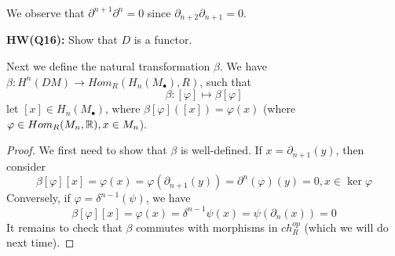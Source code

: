 We observe that $\partial^{n+1}\partial^n=0$ since $\partial_{n+2}\partial_{n+1}=0$.
\begin{prob}
    \textbf{HW(Q16):} Show that $D$ is a functor.
\end{prob}
Next we define the natural transformation $\beta$. We have $\beta: H^n(DM)\to Hom_R(H_n(M_\bullet),R)$, such that 
\begin{equation*}
    \beta: [\varphi]\mapsto \beta[\varphi]
\end{equation*}
let $[x]\in H_n(M_\bullet)$, where $\beta[\varphi]([x])=\varphi(x)$ (where $\varphi\in Hom_R(M_n,\mathbb{R}), x\in M_n$).
\begin{proof}
    We first need to show that $\beta$ is well-defined. If $x=\partial_{n+1}(y)$, then consider 
    \begin{equation*}
        \beta[\varphi][x]=\varphi(x)=\varphi(\partial_{n+1}(y))=\partial^n(\varphi)(y)=0, x\in\ker\varphi
    \end{equation*}
    Conversely, if $\varphi=\delta^{n-1}(\psi)$, we have 
    \begin{equation*}
        \beta[\varphi][x]=\varphi(x)=\delta^{n-1}\psi(x)=\psi(\partial_n(x))=0
    \end{equation*}
    It remains to check that $\beta$ commutes with morphisms in $ch_R^{op}$ (which we will do next time).
\end{proof}


